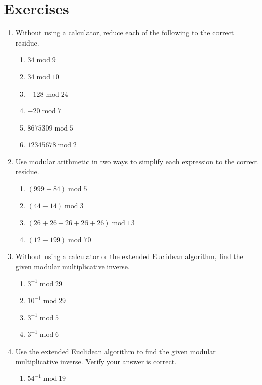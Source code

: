 \documentclass{book}
\theoremstyle{plain}
\theoremstyle{definition}
\newif\ifprintsolutions
\newcommand{\solution}[1]{\ifprintsolutions \begin{sloppypar}{\it #1}\end{sloppypar} \fi} %
\renewcommand{\mod}{\operatorname{mod}}
\renewcommand{\mod}{\operatorname{mod}}
\begin{document}
\section{Exercises}
\begin{enumerate}
\item Without using a calculator, reduce each of the following to the correct residue.
\begin{enumerate}
\item $34 \mod 9$ \solution{$34 \equiv 7 \mod 9$}
\item $34 \mod 10$ \solution{$34 \equiv 4 \mod 10$}
\item $-128 \mod 24$ \solution{$-128 \equiv 16 \mod 24$}
\item $-20 \mod 7$ \solution{$-20 \equiv 1 \mod 7$}
\item $8675309 \mod 5$ \solution{$8675309 \equiv 4 \mod 5$}
\item $12345678 \mod 2$ \solution{$12345678 \equiv 0 \mod 2$}
\end{enumerate}
\item Use modular arithmetic in two ways to simplify each expression to the correct residue.
\begin{enumerate}
\item $(999+84) \mod 5$ \solution{$4+4 \equiv 3 \mod 5$}
\item $(44-14) \mod 3$ \solution{$2-2 \equiv 0 \mod 3$}
\item $(26+26+26+26+26) \mod 13$ \solution{$0+0+0+0+0 \equiv 0 \mod 13$}
\item $(12-199) \mod 70$ \solution{$12-59 \equiv -47 \equiv 23 \mod 70$}
\end{enumerate}
\item Without using a calculator or the extended Euclidean algorithm, find the given modular multiplicative inverse.
\begin{enumerate}
\item $3^{-1} \mod 29$ \solution{$10$}
\item $10^{-1} \mod 29$ \solution{$3$}
\item $3^{-1} \mod 5$ \solution{$2$}
\item $3^{-1} \mod 6$ \solution{does not exist}
\end{enumerate}
\item Use the extended Euclidean algorithm to find the given modular multiplicative inverse. Verify your answer is correct.
\begin{enumerate}
\item $54^{-1} \mod 19$ \solution{$6$}

\end{enumerate}
\end{enumerate}
\end{document}

